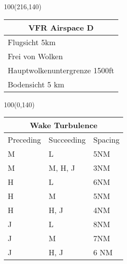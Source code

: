 \documentclass[10pt,landscape,a4paper]{article}
\begin{document}
\begin{textblock}{100}(216,140)
\begin{table}[]
\begin{tabular}{|l|}
\multicolumn{1}{c}{\textbf{VFR Airspace D}} \\ \hline
 Flugsicht 5km   \\ \hline
Frei von Wolken   \\ \hline
Hauptwolkenuntergrenze 1500ft \\ \hline
Bodensicht 5 km \\ \hline
\end{tabular}
\end{table}
\end{textblock}

\begin{textblock}{100}(0,140)
\begin{table}[]
\begin{tabular}{|l|l|l|}
\multicolumn{3}{c}{\textbf{Wake Turbulence}} \\ \hline
Preceding & Succeeding & Spacing \\ \hline
 M  & L  & 5NM   \\ \hline
 M  & M, H, J  & 3NM   \\ \hline
 H  & L & 6NM   \\ \hline
 H  & M & 5NM   \\ \hline
 H  & H, J & 4NM \\ \hline
 J &  L & 8NM \\ \hline
 J &  M & 7NM \\ \hline
 J &  H, J  & 6 NM   \\ \hline
\end{tabular}
\end{table}
\end{textblock}
\end{document}
